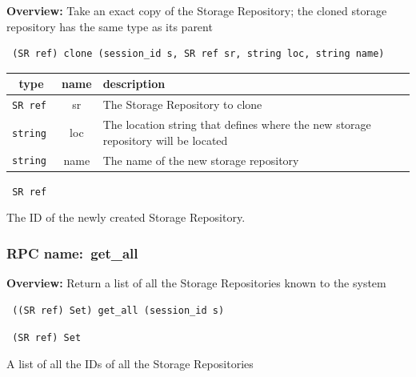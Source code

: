 {\bf Overview:} 
Take an exact copy of the Storage Repository;
        the cloned storage repository has the same type as its parent

\begin{verbatim} (SR ref) clone (session_id s, SR ref sr, string loc, string name)\end{verbatim}



 
\vspace{0.3cm}
\begin{tabular}{|c|c|p{7cm}|}
 \hline
{\bf type} & {\bf name} & {\bf description} \\ \hline
{\tt SR ref } & sr & The Storage Repository to clone \\ \hline 

{\tt string } & loc & The location string that defines where the new storage repository will be located \\ \hline 

{\tt string } & name & The name of the new storage repository \\ \hline 

\end{tabular}

\vspace{0.3cm}

{\tt 
SR ref
}


The ID of the newly created Storage Repository.
\vspace{0.3cm}
\vspace{0.3cm}
\vspace{0.3cm}
\subsubsection{RPC name:~get\_all}

{\bf Overview:} 
Return a list of all the Storage Repositories known to the system

\begin{verbatim} ((SR ref) Set) get_all (session_id s)\end{verbatim}


\vspace{0.3cm}

{\tt 
(SR ref) Set
}


A list of all the IDs of all the Storage Repositories
\vspace{0.3cm}
\vspace{0.3cm}
\vspace{0.3cm}
